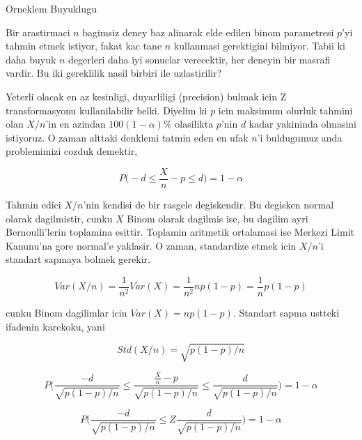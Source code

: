 \documentclass[12pt,fleqn]{article}\usepackage{../common}
\begin{document}
Orneklem Buyuklugu

Bir arastirmaci $n$ bagimsiz deney baz alinarak elde edilen binom
parametresi $p$'yi tahmin etmek istiyor, fakat kac tane $n$ kullanmasi
gerektigini bilmiyor. Tabii ki daha buyuk $n$ degerleri daha iyi sonuclar
verecektir, her deneyin bir masrafi vardir. Bu iki gereklilik nasil birbiri
ile uzlastirilir?

Yeterli olacak en az kesinligi, duyarliligi (precision) bulmak icin Z
transformasyonu kullanilabilir belki. Diyelim ki $p$ icin maksimum olurluk
tahmini olan $X/n$'in en azindan $100(1-\alpha)\%$ olasilikta $p$'nin $d$
kadar yakininda olmasini istiyoruz. O zaman alttaki denklemi tatmin eden en
ufak $n$'i buldugumuz anda problemimizi cozduk demektir, 

$$ P\bigg( -d \le \frac{X}{n} - p \le d \bigg)  = 1-\alpha$$

Tahmin edici $X/n$'nin kendisi de bir rasgele degiskendir. Bu degisken
normal olarak dagilmistir, cunku $X$ Binom olarak dagilmis ise, bu dagilim
ayri Bernoulli'lerin toplamina esittir. Toplamin aritmetik ortalamasi ise
Merkezi Limit Kanunu'na gore normal'e yaklasir. O zaman, standardize etmek
icin $X/n$'i standart sapmaya bolmek gerekir. 

$$ Var(X/n) = \frac{1}{n^2}Var(X) = \frac{1}{n^2}np(1-p)=
\frac{1}{n}p(1-p) 
$$

cunku Binom dagilimlar icin $Var(X) = np(1-p)$. Standart sapma ustteki
ifadenin karekoku, yani 

$$ Std(X/n) = \sqrt{p(1-p)/n}
$$


$$ P\bigg( 
\frac{-d}{\sqrt{p(1-p)/n}} \le 
\frac{\frac{X}{n} - p }{\sqrt{p(1-p)/n}}\le 
\frac{d}{\sqrt{p(1-p)/n}} 
\bigg)  = 
1-\alpha$$


$$ P\bigg( 
\frac{-d}{\sqrt{p(1-p)/n}} \le 
Z
\frac{d}{\sqrt{p(1-p)/n}} 
\bigg)  = 
1-\alpha$$
\end{document}

